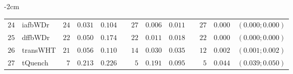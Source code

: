 \begin{table*}[!htbp]
\begin{adjustwidth*}{}{-2cm}
\begin{tabular}{@{}rlrrrrrrrrrcc@{}}
\footnotesize{$24$} & \footnotesize{iafbWDr  } & \footnotesize{$24$} & \footnotesize{$0.031$} & \footnotesize{$0.104$} && \footnotesize{$27$} & \footnotesize{$0.006$} & \footnotesize{$0.011$} && \footnotesize{$27$} & \footnotesize{$0.000$} & \footnotesize{$(0.000;0.000)$} \\
\footnotesize{$25$} & \footnotesize{dffbWDr  } & \footnotesize{$22$} & \footnotesize{$0.050$} & \footnotesize{$0.174$} && \footnotesize{$22$} & \footnotesize{$0.011$} & \footnotesize{$0.018$} && \footnotesize{$22$} & \footnotesize{$0.000$} & \footnotesize{$(0.000;0.000)$} \\
\footnotesize{$26$} & \footnotesize{transWHT } & \footnotesize{$21$} & \footnotesize{$0.056$} & \footnotesize{$0.110$} && \footnotesize{$14$} & \footnotesize{$0.030$} & \footnotesize{$0.035$} && \footnotesize{$12$} & \footnotesize{$0.002$} & \footnotesize{$(0.001;0.002)$} \\
\footnotesize{$27$} & \footnotesize{tQuench  } & \footnotesize{$7 $} & \footnotesize{$0.213$} & \footnotesize{$0.226$} && \footnotesize{$5 $} & \footnotesize{$0.191$} & \footnotesize{$0.095$} && \footnotesize{$5 $} & \footnotesize{$0.044$} & \footnotesize{$(0.039;0.050)$} \\
\bottomrule
\end{tabular}
\end{adjustwidth*}
\end{table*}

